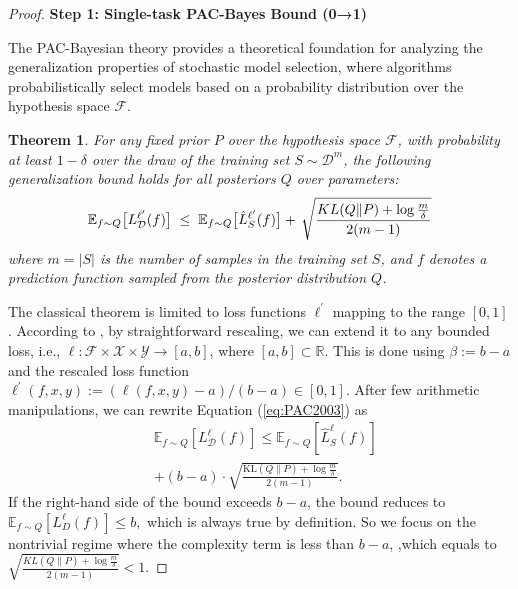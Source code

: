 \documentclass[letterpaper]{article} %
\newtheorem{theorem}{Theorem}
\begin{document}
\begin{proof}
\textbf{Step 1: Single-task PAC-Bayes Bound (0→1)}

The PAC-Bayesian theory provides a theoretical foundation for analyzing the generalization properties of stochastic model selection, where algorithms probabilistically select models based on a probability distribution over the hypothesis space \(\mathcal{F}\). 


\begin{theorem}
    For any fixed prior $P$ over the hypothesis space $\mathcal{F}$, with probability at least $1 - \delta$ over the draw of the training set $S \sim \mathcal{D}^m$, the following generalization bound holds for all posteriors $Q$ over parameters:
\begin{equation}\label{eq:PAC2003-2}
\begin{aligned}
    \mathbb{E}_{f \sim Q}\big[L_{\mathcal{D}}^{\ell'}(f)\big] \;\leq\;
    \mathbb{E}_{f \sim Q}\big[\hat{L}^{\ell'}_{S}(f)\big]
    +\, \sqrt{
        \frac{
            KL(Q\|P) + \log\frac{m}{\delta}
        }{
            2(m-1)
        }
    }
\end{aligned}\notag
\end{equation}
where $m = |S|$ is the number of samples in the training set $S$, and $f$ denotes a prediction function sampled from the posterior distribution $Q$.
\end{theorem}



The classical theorem is limited to loss functions $\ell^{'}$ mapping to the range $[0,1]$. According to \citep{germainPACBayesianTheoryMeets2016}, by straightforward rescaling, we can extend it to any bounded loss, i.e., $\ell: \mathcal{F} \times \mathcal{X} \times \mathcal{Y} \rightarrow[a, b]$, where $[a, b] \subset \mathbb{R}$. This is done using $\beta:=b-a$ and the rescaled loss function $\ell^{\prime}(f, x, y):=(\ell(f, x, y)-a) /(b-a) \in[0,1]$. After few arithmetic manipulations, we can rewrite Equation (\ref{eq:PAC2003}) as
\begin{equation}
\begin{aligned}
        &\mathbb{E}_{f \sim Q}[{L}_\mathcal{D}^{\ell}(f)] \leq \mathbb{E}_{f\sim Q}[\widehat{{L}}_S^{\ell}(f)] \\
        &+ (b - a) \cdot \sqrt{\frac{\mathrm{KL}(Q \| P) + \log \frac{m}{\delta}}{2(m - 1)}} .
\end{aligned}
\end{equation}
If the right-hand side of the bound exceeds $b-a$, the bound reduces to
$\mathbb{E}_{f \sim Q}[L_D^{\ell}(f)] \leq b,$
which is always true by definition. So we focus on the nontrivial regime where the complexity term is less than $b-a$, ,which equals to
$\sqrt{\frac{KL(Q\|P)+\log \frac{m}{\delta}}{2(m-1)}} <1. $



\end{proof}
\end{document}
